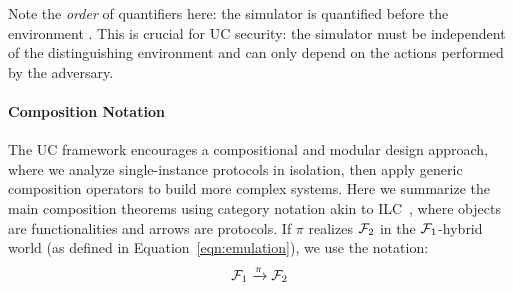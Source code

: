 Note the \emph{order} of quantifiers here: the simulator \Sim is quantified before the environment \Z.
This is crucial for UC security: the simulator must be independent of the distinguishing environment
and can only depend on the actions performed by the adversary. 


\paragraph*{\textbf{Composition Notation}}
The UC framework encourages a compositional and modular design approach,
where we analyze single-instance protocols in isolation, then apply generic composition operators to build more complex systems.
Here we summarize the main composition theorems using category notation akin to ILC~\cite{ilc},
where objects are functionalities and arrows are protocols.
If $\pi$ realizes $\mathcal{F}_2$ in the $\mathcal{F}_1$-hybrid world (as defined in Equation~\ref{eqn:emulation}), we use the notation:
\[
    \mathcal{F}_1 \xrightarrow{\pi} \mathcal{F}_2
\]

